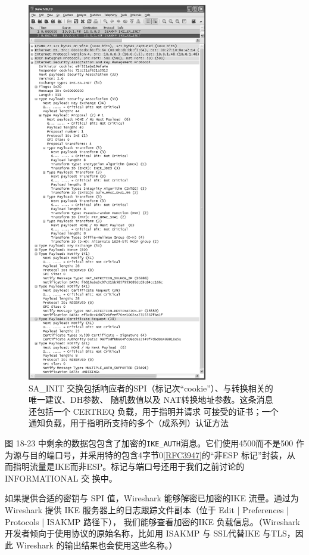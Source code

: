 \begin{figure}[!htb]
    \centering
	\includegraphics[width=0.7\textwidth]{imgs/18/18-23.png}
	\caption{SA\_INIT 交换包括响应者的SPI（标记次“cookie”）、与转换相关的唯一建议、DH参数、
            随机数值以及 NAT转换地址参数。这条消息还包括一个 CERTREQ 负载，用于指明并请求
            可接受的证书；一个通知负载，用于指明所支持的多个（成系列）认证方法}
\end{figure}

图 18-23 中剩余的数据包包含了加密的\verb|IKE_AUTH|消息。它们使用4500而不是500
作为源与目的端口号，并采用特的包含4字节0\href{https://www.rfc-editor.org/rfc/rfc3947}{[RFC3947]}的“非ESP 标记”封装，从
而指明流量是IKE而非ESP。标记与端口号还用于我们之前讨论的 INFORMATIONAL 交
换中。

如果提供合适的密钥与 SPI 值，Wireshark 能够解密已加密的IKE 流量。通过为Wireshark
提供 IKE 服务器上的日志跟踪文件副本（位于 Edit | Preferences | Protocols | ISAKMP 路径下），
我们能够查看加密的IKE 负载信息。（Wireshark 开发者倾向于使用协议的原始名称，比如用
ISAKMP 与 SSL代替IKE 与TLS，因此 Wireshark 的输出结果也会使用这些名称。）

